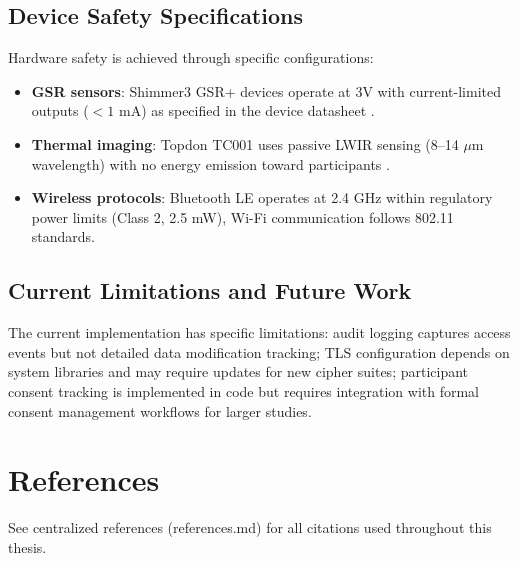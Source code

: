 \subsection{Device Safety Specifications}
Hardware safety is achieved through specific configurations:
\begin{itemize}
    \item \textbf{GSR sensors}: Shimmer3 GSR+ devices operate at 3V with current-limited outputs ($<1$ mA) as specified in the device datasheet \cite{ref8}.
    \item \textbf{Thermal imaging}: Topdon TC001 uses passive LWIR sensing (8--14 $\mu$m wavelength) with no energy emission toward participants \cite{ref16}.
    \item \textbf{Wireless protocols}: Bluetooth LE operates at 2.4 GHz within regulatory power limits (Class 2, 2.5 mW), Wi-Fi communication follows 802.11 standards.
\end{itemize}

\subsection{Current Limitations and Future Work}
The current implementation has specific limitations: audit logging captures access events but not detailed data modification tracking; TLS configuration depends on system libraries and may require updates for new cipher suites; participant consent tracking is implemented in code but requires integration with formal consent management workflows for larger studies.


\section*{References}
See centralized references (references.md) for all citations used throughout this thesis.
